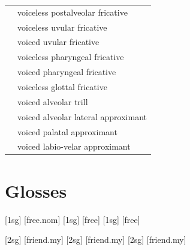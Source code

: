 \documentclass{article}
\begin{document}
\begin{xltabular}{\textwidth}{lL}
   & voiceless postalveolar fricative \\
   & voiceless uvular fricative \\
   & voiced uvular fricative \\
   & voiceless pharyngeal fricative \\
   & voiced pharyngeal fricative \\
   & voiceless glottal fricative \\
   & voiced alveolar trill \\
   & voiced alveolar lateral approximant \\
   & voiced palatal approximant \\
   & voiced labio-velar approximant \\
\end{xltabular}

\newpage\section{Glosses}

\pex[lingstyle=custom_nlevel, labeltype=caps]
\a \begingl
{}[{\sc 1sg}]
[free.{\sc nom}]
\endgl
\a \begingl
{}[{\sc 1sg}]
[free]
\endgl
\a \begingl
{}[{\sc 1sg}]
[free]
\endgl
\xe

\pex[lingstyle=custom_nlevel, labeltype=caps]
\a \begingl
{}[{\sc 2sg}]
[friend.my]
\endgl
\a \begingl
{}[{\sc 2sg}]
[friend.my]
\endgl
\a \begingl
{}[{\sc 2sg}]
[friend.my]
\endgl
\xe
\end{document}
